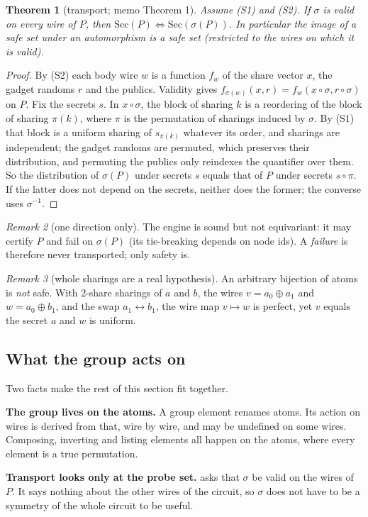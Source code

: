\documentclass[11pt,a4paper]{article}
\newtheorem{theorem}{Theorem}[section]
\theoremstyle{definition}
\theoremstyle{remark}
\newtheorem{remark}[theorem]{Remark}
\newcommand{\Sec}{\mathrm{Sec}}
\begin{document}
\begin{theorem}[transport; memo Theorem 1]\label{thm:transport}
Assume (S1) and (S2).  If $\sigma$ is valid on every wire of $P$, then
$\Sec(P)\iff\Sec(\sigma(P))$.  In particular the image of a safe set under an automorphism is a
safe set (restricted to the wires on which it is valid).
\end{theorem}
\begin{proof}
By (S2) each body wire $w$ is a function $f_w$ of the share vector $x$, the gadget randoms $r$ and
the publics.  Validity gives $f_{\sigma(w)}(x,r) = f_w(x\circ\sigma, r\circ\sigma)$ on $P$.  Fix
the secrets $s$.  In $x\circ\sigma$, the block of sharing $k$ is a reordering of the block of
sharing $\pi(k)$, where $\pi$ is the permutation of sharings induced by $\sigma$.  By (S1) that
block is a uniform sharing of $s_{\pi(k)}$ whatever its order, and sharings are independent; the
gadget randoms are permuted, which preserves their distribution, and permuting the publics only
reindexes the quantifier over them.  So the distribution of $\sigma(P)$ under secrets $s$ equals
that of $P$ under secrets $s\circ\pi$.  If the latter does not depend on the secrets, neither does
the former; the converse uses $\sigma^{-1}$.
\end{proof}

\begin{remark}[one direction only]
The engine is sound but not equivariant: it may certify $P$ and fail on $\sigma(P)$ (its
tie-breaking depends on node ids).  A \emph{failure} is therefore never transported; only
safety is.
\end{remark}

\begin{remark}[whole sharings are a real hypothesis]\label{rem:wholesharings}
An arbitrary bijection of atoms is \emph{not} safe.  With 2-share sharings of $a$ and $b$, the
wires $v=a_0\oplus a_1$ and $w=a_0\oplus b_1$, and the swap $a_1\leftrightarrow b_1$, the wire map
$v\mapsto w$ is perfect, yet $v$ equals the secret $a$ and $w$ is uniform.
\end{remark}

\subsection{What the group acts on}

Two facts make the rest of this section fit together.

\begin{intuition}
\textbf{The group lives on the atoms.}  A group element renames atoms.  Its action on wires
is derived from that, wire by wire, and may be undefined on some wires.  Composing, inverting
and listing elements all happen on the atoms, where every element is a true permutation.

\textbf{Transport looks only at the probe set.}   asks that $\sigma$ be
valid on the wires of $P$.  It says nothing about the other wires of the circuit, so $\sigma$
does not have to be a symmetry of the whole circuit to be useful.
\end{intuition}
\end{document}
